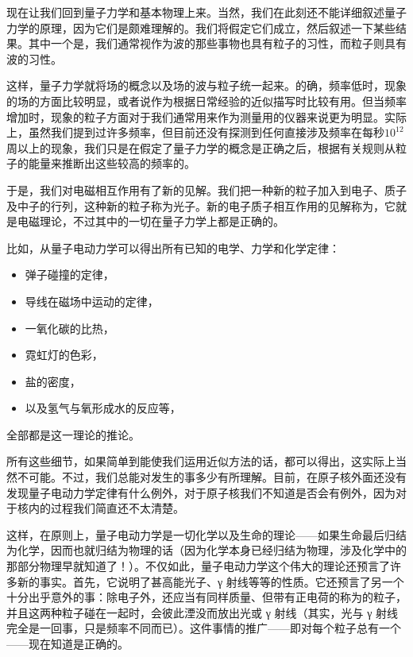  现在让我们回到量子力学和基本物理上来。当然，我们在此刻还不能详细叙述量子力学的原理，因为它们是颇难理解的。我们将假定它们成立，然后叙述一下某些结果。其中一个是，我们通常视作为波的那些事物也具有粒子的习性，而粒子则具有波的习性。

这样，量子力学就将场的概念以及场的波与粒子统一起来。的确，频率低时，现象的场的方面比较明显，或者说作为根据日常经验的近似描写时比较有用。但当频率增加时，现象的粒子方面对于我们通常用来作为测量用的仪器来说更为明显。实际上，虽然我们提到过许多频率，但目前还没有探测到任何直接涉及频率在每秒$10^{12}$周以上的现象，我们只是在假定了量子力学的概念是正确之后，根据有关规则从粒子的能量来推断出这些较高的频率的。

 于是，我们对电磁相互作用有了新的见解。我们把一种新的粒子加入到电子、质子及中子的行列，这种新的粒子称为光子。新的电子质子相互作用的见解称为，它就是电磁理论，不过其中的一切在量子力学上都是正确的。

比如，从量子电动力学可以得出所有已知的电学、力学和化学定律：

\begin{itemize}
  \item 弹子碰撞的定律，
  \item 导线在磁场中运动的定律，
  \item 一氧化碳的比热，
  \item 霓虹灯的色彩，
  \item 盐的密度，
  \item 以及氢气与氧形成水的反应等，
\end{itemize}

全部都是这一理论的推论。

所有这些细节，如果简单到能使我们运用近似方法的话，都可以得出，这实际上当然不可能。不过，我们总能对发生的事多少有所理解。目前，在原子核外面还没有发现量子电动力学定律有什么例外，对于原子核我们不知道是否会有例外，因为对于核内的过程我们简直还不太清楚。

 这样，在原则上，量子电动力学是一切化学以及生命的理论——如果生命最后归结为化学，因而也就归结为物理的话（因为化学本身已经归结为物理，涉及化学中的那部分物理早就知道了！）。不仅如此，量子电动力学这个伟大的理论还预言了许多新的事实。首先，它说明了甚高能光子、γ 射线等等的性质。它还预言了另一个十分出乎意外的事：除电子外，还应当有同样质量、但带有正电荷的称为的粒子，并且这两种粒子碰在一起时，会彼此湮没而放出光或 γ 射线（其实，光与 γ 射线完全是一回事，只是频率不同而已）。这件事情的推广——即对每个粒子总有一个——现在知道是正确的。

